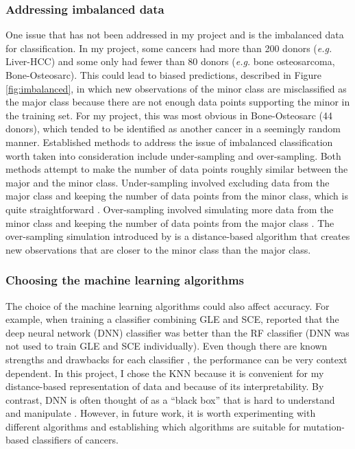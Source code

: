 \subsubsection{Addressing imbalanced data}
One issue that has not been addressed in my project and \citet{Jiao2020} is the imbalanced data for classification. In my project, some cancers had more than 200 donors (\textit{e.g.} Liver-HCC) and some only had fewer than 80 donors (\textit{e.g.} bone osteosarcoma, Bone-Osteosarc). This could lead to biased predictions, described in Figure \ref{fig:imbalanced}, in which new observations of the minor class are misclassified as the major class because there are not enough data points supporting the minor in the training set. For my project, this was most obvious in Bone-Osteosarc (44 donors), which tended to be identified as another cancer in a seemingly random manner. Established methods to address the issue of imbalanced classification worth taken into consideration include under-sampling and over-sampling. Both methods attempt to make the number of data points roughly similar between the major and the minor class. Under-sampling involved excluding data from the major class and keeping the number of data points from the minor class, which is quite straightforward \citep{Kubat1997AddressingSelection}. Over-sampling involved simulating more data from the minor class and keeping the number of data points from the major class \citep{Chawla2002SMOTE:Technique}. The over-sampling simulation introduced by \citet{Chawla2002SMOTE:Technique} is a distance-based algorithm that creates new observations that are closer to the minor class than the major class. 



\subsubsection{Choosing the machine learning algorithms}
The choice of the machine learning algorithms could also affect accuracy. For example, when training a classifier combining GLE and SCE, \citet{Jiao2020} reported that the deep neural network (DNN) classifier was better than the RF classifier (DNN was not used to train GLE and SCE individually). Even though there are known strengths and drawbacks for each classifier \citep{Susmita2019AAlgorithms}, the performance can be very context dependent. In this project, I chose the KNN because it is convenient for my distance-based representation of data and because of its interpretability. By contrast, DNN is often thought of as a ``black box'' that is hard to understand and manipulate \citep{Shwartz-Ziv2017OpeningInformation}. However, in future work, it is worth experimenting with different algorithms and establishing which algorithms are suitable for mutation-based classifiers of cancers. 

